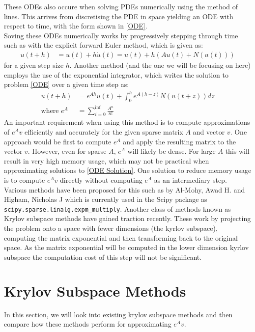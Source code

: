 \documentclass{article}
\begin{document}
These ODEs also occure when solving PDEs numerically using the method of lines.
This arrives from discretising the PDE in space yielding an ODE with respect to time, with the form shown in \eqref{ODE}.\\
Soving these ODEs numerically works by progressively stepping through time such as with the explicit forward Euler method, which is given as:
\begin{align*}
u(t+h) &= u(t) + h\dot u(t) = u(t) + h(Au(t) + N(u(t)))
\end{align*}
for a given step size $h$.
Another method (and the one we will be focusing on here) employs the use of the exponential integrator, which writes the solution to problem \eqref{ODE} over a given time step as:
\begin{align*}
u(t+h) &= e^{Ah}u(t) + \int_0^h e^{A(h-z)}N(u(t+z)) dz \label{ODE Solution}\\
\text{where } e^{A} &= \sum^{\inf}_{i = 0}\frac{A^n}{n!}
\end{align*}
An important requirement when using this method is to compute approximations of $e^{A}v$ efficiently and accurately for the given sparse matrix $A$ and vector $v$.
One approach would be first to compute $e^A$ and apply the resulting matrix to the vector $v$.
However, even for sparse $A$, $e^{A}$ will likely be dense. For large $A$ this will result in very high memory usage, which may not be practical when approximating solutions to \eqref{ODE Solution}.
One solution to reduce memory usage is to compute $e^{A}v$ directly without computing $e^{A}$ as an intermediary step.\\
Various methods have been proposed for this such as by Al-Mohy, Awad H. and Higham, Nicholas J\cite{AlMohy2011} which is currently used in the Scipy package as \verb|scipy.sparse.linalg.expm_multiply|.
Another class of methods known as Krylov subspace methods have gained traction recently\cite{Moler2003}.
These work by projecting the problem onto a space with fewer dimensions (the kyrlov subspace), computing the matrix exponential and then transforming back to the original space.
As the matrix exponential will be computed in the lower dimension kyrlov subspace the computation cost of this step will not be significant.
\section{Krylov Subspace Methods}
In this section, we will look into existing krylov subspace methods and then compare how these methods perform for approximating $e^{A}v$.
\end{document}
